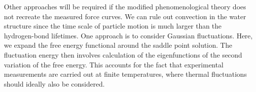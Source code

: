 Other approaches will be required if the modified phenomenological
theory does not recreate the measured force curves. We can rule out
convection in the water structure since the time scale of particle
motion is much larger than the hydrogen-bond lifetimes. One approach is
to consider Gaussian fluctuations. Here, we expand the free energy
functional around the saddle point solution. The fluctuation energy then
involves calculation of the eigenfunctions of the second variation of
the free energy. This accounts for the fact that experimental
measurements are carried out at finite temperatures, where thermal
fluctuations should ideally also be considered. 

%
%
%

